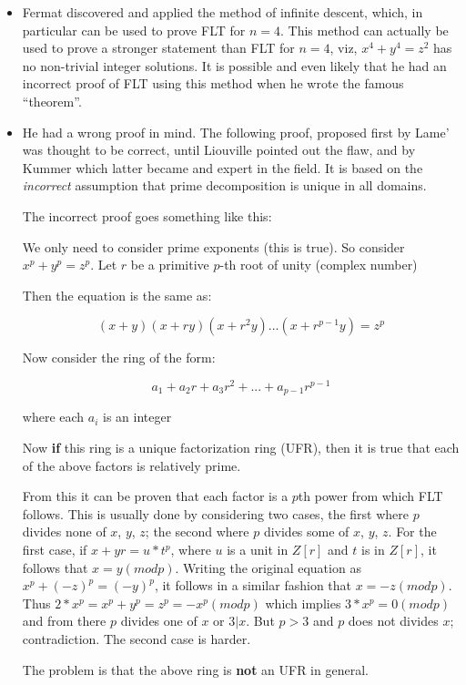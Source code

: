 \begin{itemize}
\item Fermat discovered and applied the method of infinite descent, which,
in particular can be used to prove FLT for $n=4$.  This method can
actually be used to prove a stronger statement than FLT for $n=4$, viz,
$x^4 + y^4 = z^2$ has no non-trivial integer solutions.
  It is possible and even likely that he had an incorrect proof of FLT
using this method when he wrote the famous ``theorem''.
\item He had a wrong proof in mind. The following proof, proposed first
by Lame' was thought to be correct, until Liouville pointed out the
flaw, and by Kummer which latter became and expert in the field.
It is based on the {\em incorrect} assumption that prime decomposition is
unique in all domains.

The incorrect proof goes something like this:

We only need to consider prime exponents (this is true).
So consider $x^p + y^p = z^p$.  Let $r$ be a primitive $p$-th root of unity 
(complex number)

Then the equation is the same as:

\[(x+y)(x+ry)(x+r^2y)...(x+r^{p-1}y) = z^p\]

Now consider the ring of the form:

\[a_1 + a_2 r + a_3 r^2 + ... + a_{p-1}   r^{p-1}\] 

where each $a_i$  is an integer

Now {\bf if} this ring is a unique factorization ring (UFR), then it is true
that each of the above factors is relatively prime.

From this it can be proven that each factor is a $p$th power from
which FLT follows.  This is usually done by considering two cases, the
first where $p$ divides none of $x$, $y$, $z$; the second where $p$
divides some of $x$, $y$, $z$.  For the first case, if $x+yr=u*t^p$,
where $u$ is a unit in $Z[r]$ and $t$ is in $Z[r]$, it follows that
$x=y (mod p)$. Writing the original equation as $x^p + (-z)^p =
(-y)^p$, it follows in a similar fashion that $x = -z (mod p)$.  Thus
$2*x^p = x^p + y^p = z^p = -x^p (mod p)$ which implies $3*x^p = 0 (mod
p)$ and from there $p$ divides one of $x$ or $3|x$. But $p>3$ and $p$
does not divides $x$; contradiction.  The second case is harder.


The problem is that the above ring is {\bf not} an UFR in general.

\end{itemize}

